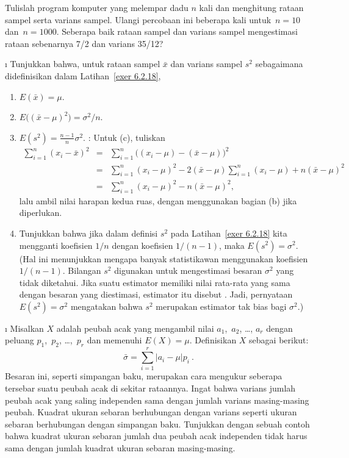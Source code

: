 \begin{LJSItem}
Tulislah program komputer yang melempar dadu $n$ kali dan menghitung rataan sampel
serta varians sampel.  Ulangi percobaan ini beberapa kali untuk~$n = 10$ dan~$n =
1000$.  Seberapa baik rataan sampel dan varians sampel mengestimasi rataan sebenarnya
7/2 dan varians 35/12?

\i\label{exer 6.2.19} Tunjukkan bahwa, untuk rataan sampel $\bar x$ dan varians
sampel $s^2$ sebagaimana didefinisikan dalam Latihan~\ref{exer 6.2.18},
\begin{enumerate}
\item $E(\bar x) = \mu$.

\item $E\bigl((\bar x - \mu)^2\bigr) = \sigma^2/n$.

\item $E(s^2) = \frac {n-1}n\sigma^2$. : Untuk (c), tuliskan
\begin{eqnarray*}
\sum_{i = 1}^n (x_i - \bar x)^2 & = & \sum_{i = 1}^n \bigl((x_i - \mu) -
(\bar x - \mu)\bigr)^2 \\
     & = & \sum_{i = 1}^n (x_i - \mu)^2 - 2(\bar x - \mu) \sum_{i = 1}^n (x_i -
\mu) + n(\bar x - \mu)^2 \\
     & = & \sum_{i = 1}^n (x_i - \mu)^2 - n(\bar x - \mu)^2,
\end{eqnarray*} lalu ambil nilai harapan kedua ruas, dengan menggunakan bagian (b)
jika diperlukan.

\item Tunjukkan bahwa jika dalam definisi $s^2$ pada Latihan~\ref{exer 6.2.18} kita
mengganti koefisien $1/n$ dengan koefisien $1/(n-1)$, maka $E(s^2) = \sigma^2$.
(Hal ini menunjukkan mengapa banyak statistikawan menggunakan koefisien $1/(n-1)$.
Bilangan $s^2$ digunakan untuk mengestimasi besaran $\sigma^2$ yang tidak diketahui.
Jika suatu estimator memiliki nilai rata-rata yang sama dengan besaran yang
diestimasi, estimator itu disebut .  Jadi,
pernyataan $E(s^2) = \sigma^2$ mengatakan bahwa $s^2$ merupakan estimator tak bias
bagi $\sigma^2$.)
\end{enumerate}

\i\label{exer 6.2.20} Misalkan $X$ adalah peubah acak yang mengambil nilai
$a_1$,~$a_2$, \dots, $a_r$ dengan peluang $p_1$,~$p_2$, \dots,~$p_r$ dan memenuhi
$E(X) = \mu$.  Definisikan  $X$ sebagai berikut:
$$
\bar\sigma = \sum_{i = 1}^r |a_i - \mu|p_i\ .
$$ Besaran ini, seperti simpangan baku, merupakan cara mengukur seberapa tersebar
suatu peubah acak di sekitar rataannya.  Ingat bahwa varians jumlah peubah acak yang
saling independen sama dengan jumlah varians masing-masing peubah.  Kuadrat ukuran
sebaran berhubungan dengan varians seperti ukuran sebaran berhubungan dengan simpangan
baku.  Tunjukkan dengan sebuah contoh bahwa kuadrat ukuran sebaran jumlah dua peubah
acak independen tidak harus sama dengan jumlah kuadrat ukuran sebaran masing-masing.


\end{LJSItem}
